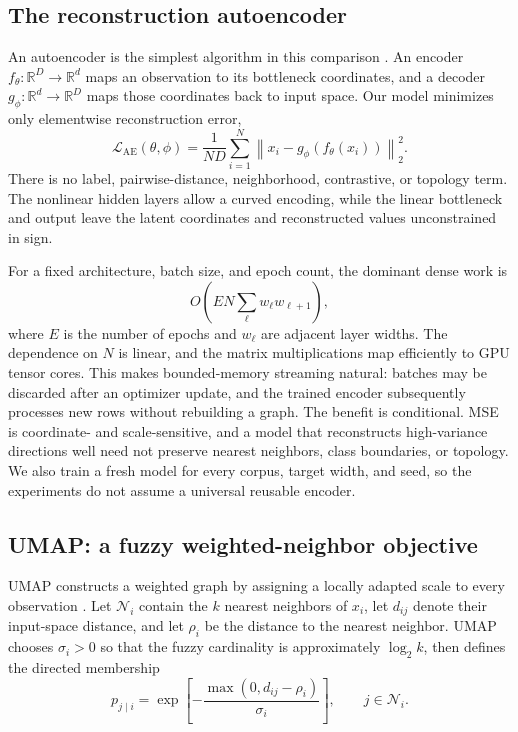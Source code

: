 \documentclass[10pt]{article}
\newcommand{\R}{\mathbb{R}}
\begin{document}
\subsection{The reconstruction autoencoder}

An autoencoder is the simplest algorithm in this comparison \cite{hinton2006}.  An encoder
$f_\theta:\R^D\to\R^d$ maps an observation to its bottleneck coordinates, and a decoder
$g_\phi:\R^d\to\R^D$ maps those coordinates back to input space.  Our model minimizes
only elementwise reconstruction error,
\begin{equation}
  \mathcal{L}_{\mathrm{AE}}(\theta,\phi)
  =\frac{1}{ND}\sum_{i=1}^{N}
    \left\|x_i-g_\phi\!\left(f_\theta(x_i)\right)\right\|_2^2.
  \label{eq:ae-loss}
\end{equation}
There is no label, pairwise-distance, neighborhood, contrastive, or topology term.
The nonlinear hidden layers allow a curved encoding, while the linear bottleneck and
output leave the latent coordinates and reconstructed values unconstrained in sign.

For a fixed architecture, batch size, and epoch count, the dominant dense work is
\[
  O\!\left(E N\sum_{\ell}w_{\ell}w_{\ell+1}\right),
\]
where $E$ is the number of epochs and $w_\ell$ are adjacent layer widths.  The
dependence on $N$ is linear, and the matrix multiplications map efficiently to GPU tensor
cores.  This makes bounded-memory streaming natural: batches may be discarded after an
optimizer update, and the trained encoder subsequently processes new rows without
rebuilding a graph.  The benefit is conditional.  MSE is coordinate- and scale-sensitive,
and a model that reconstructs high-variance directions well need not preserve nearest
neighbors, class boundaries, or topology.  We also train a fresh model for every corpus,
target width, and seed, so the experiments do not assume a universal reusable encoder.

\subsection{UMAP: a fuzzy weighted-neighbor objective}

UMAP constructs a weighted graph by assigning a locally adapted scale to every
observation \cite{umap}.  Let $\mathcal N_i$ contain the $k$ nearest neighbors of
$x_i$, let $d_{ij}$ denote their input-space distance, and let $\rho_i$ be the distance
to the nearest neighbor.  UMAP chooses $\sigma_i>0$ so that the fuzzy cardinality is
approximately $\log_2 k$, then defines the directed membership
\begin{equation}
 p_{j\mid i}
 =\exp\!\left[-\frac{\max(0,d_{ij}-\rho_i)}{\sigma_i}\right],
 \qquad j\in\mathcal N_i.
 \label{eq:umap-directed}
\end{equation}
\end{document}
